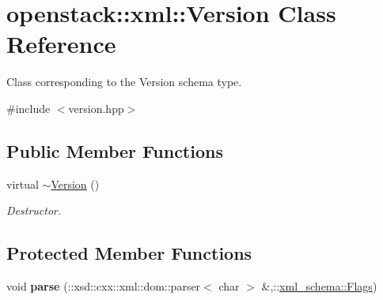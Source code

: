 \hypertarget{classopenstack_1_1xml_1_1Version}{
\section{openstack::xml::Version Class Reference}
\label{classopenstack_1_1xml_1_1Version}
}


Class corresponding to the Version schema type.  




{\ttfamily \#include $<$version.hpp$>$}

\subsection*{Public Member Functions}
\begin{DoxyCompactItemize}
\item 
\hypertarget{classopenstack_1_1xml_1_1Version_a8c0b1f830b84d52662a342bfae03bd19}{
virtual \hyperlink{classopenstack_1_1xml_1_1Version_a8c0b1f830b84d52662a342bfae03bd19}{$\sim$Version} ()}
\label{classopenstack_1_1xml_1_1Version_a8c0b1f830b84d52662a342bfae03bd19}

\begin{DoxyCompactList}\small\item\em Destructor. \item\end{DoxyCompactList}\end{DoxyCompactItemize}
\subsection*{Protected Member Functions}
\begin{DoxyCompactItemize}
\item 
\hypertarget{classopenstack_1_1xml_1_1Version_a9b0610fc378c6c19cbcb1b6c95cb5e0b}{
void {\bfseries parse} (::xsd::cxx::xml::dom::parser$<$ char $>$ \&,::\hyperlink{namespacexml__schema_affb4c227cbd9aa7453dd1dc5a1401943}{xml\_\-schema::Flags})}
\label{classopenstack_1_1xml_1_1Version_a9b0610fc378c6c19cbcb1b6c95cb5e0b}

\end{DoxyCompactItemize}
